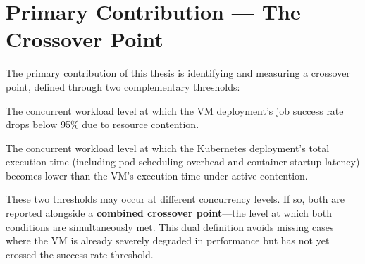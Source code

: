 
\section{Primary Contribution --- The Crossover Point}
\label{sec:crossover-point}

The primary contribution of this thesis is identifying and measuring a crossover point, defined through two complementary thresholds:

\begin{description}[style=nextline]
  \item[Reliability crossover] The concurrent workload level at which the VM deployment's job success rate drops below 95\% due to resource contention.
  \item[Performance crossover] The concurrent workload level at which the Kubernetes deployment's total execution time (including pod scheduling overhead and container startup latency) becomes lower than the VM's execution time under active contention.
\end{description}

These two thresholds may occur at different concurrency levels. If so, both are reported alongside a \textbf{combined crossover point}---the level at which both conditions are simultaneously met. This dual definition avoids missing cases where the VM is already severely degraded in performance but has not yet crossed the success rate threshold.

